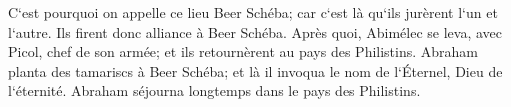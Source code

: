 \verse C`est pourquoi on appelle ce lieu Beer Schéba; car c`est là qu`ils jurèrent l`un et l`autre. 
\verse Ils firent donc alliance à Beer Schéba. Après quoi, Abimélec se leva, avec Picol, chef de son armée; et ils retournèrent au pays des Philistins. 
\verse Abraham planta des tamariscs à Beer Schéba; et là il invoqua le nom de l`Éternel, Dieu de l`éternité. 
\verse Abraham séjourna longtemps dans le pays des Philistins. 

\chapter{}

